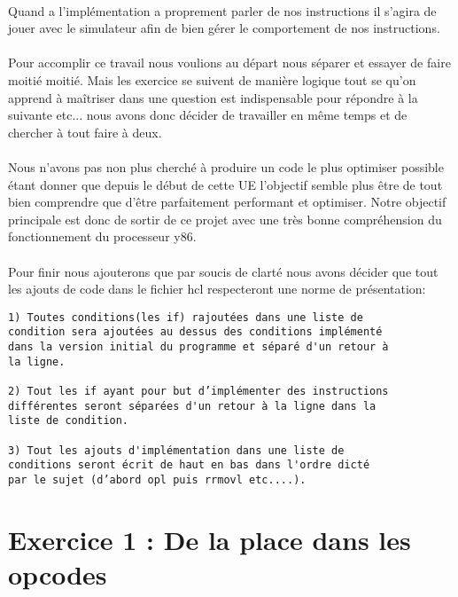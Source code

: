 \documentclass[12pt]{article}
\begin{document}
\paragraph{} Quand a l’implémentation a proprement parler de nos instructions il
s’agira de jouer avec le simulateur afin de bien gérer le comportement de nos instructions.

\paragraph{} Pour accomplir ce travail nous voulions au départ nous séparer et essayer de faire moitié moitié. Mais les exercice se suivent de manière logique tout se qu'on apprend à maîtriser dans une question est indispensable pour répondre à la suivante etc... nous avons donc décider de travailler en même temps et de chercher à tout faire à deux.

\paragraph{} Nous n'avons pas non plus cherché à produire un code le plus optimiser possible étant donner que depuis le début de cette UE l'objectif semble plus être de tout bien comprendre que d’être parfaitement performant et optimiser. Notre objectif principale est donc de sortir de ce projet avec une très bonne compréhension du fonctionnement du processeur y86.

\paragraph{} Pour finir nous ajouterons que par soucis de clarté nous avons décider que tout les ajouts de code dans le fichier hcl respecteront une norme de présentation:
\begin{verbatim}
1) Toutes conditions(les if) rajoutées dans une liste de 
condition sera ajoutées au dessus des conditions implémenté 
dans la version initial du programme et séparé d'un retour à 
la ligne.

2) Tout les if ayant pour but d’implémenter des instructions
différentes seront séparées d'un retour à la ligne dans la 
liste de condition.

3) Tout les ajouts d'implémentation dans une liste de 
conditions seront écrit de haut en bas dans l'ordre dicté 
par le sujet (d’abord opl puis rrmovl etc....).
\end{verbatim}
\newpage


\section{Exercice 1 : De la place dans les opcodes}
\end{document}

